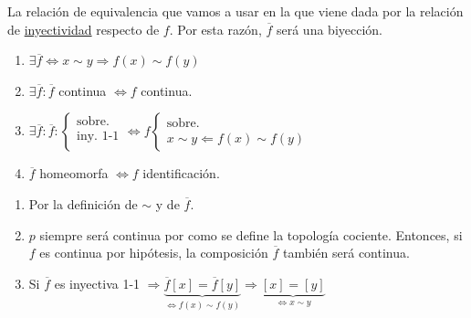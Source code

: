 \begin{obs}
La relación de equivalencia que vamos a usar en la que viene dada por la relación de \underline{inyectividad} respecto de $f$. Por esta razón, $\overline{f}$ será una biyección.
\end{obs}
\begin{prop}
\begin{enumerate}
    \item $\exists \overline{f} \Leftrightarrow x \sim y \Rightarrow f\left( x \right) \sim f\left( y \right)$
    \item $\exists \overline{f} : \overline{f}$ continua $\Leftrightarrow f$ continua.
    \item $\exists \overline{f}: \overline{f}: \begin{cases}
        \text{sobre. }\\ 
        \text{iny. 1-1}\\ 
    \end{cases} \Leftrightarrow f \begin{cases}
        \text{sobre.}\\ 
        x \sim y \Leftarrow f \left( x \right) \sim f \left( y \right)
    \end{cases}$

    \item $\overline{f}$ homeomorfa $\Leftrightarrow f$ identificación.
    \begin{figure}[H]
        \centering
    \end{figure}
\end{enumerate} 
\end{prop}
\begin{demo}
\begin{enumerate}
    \item Por la definición de $\sim$ y de $\overline{f}$.
    \item $p$ siempre será continua por como se define la topología cociente. Entonces, si $f$ es continua por hipótesis, la composición $\overline{f}$ también será continua. 

    \item Si $\overline{f}$ es inyectiva 1-1 $\Rightarrow \underbrace{\overline{f}\left[ x \right] = \overline{f}\left[ y \right]}_{\Leftrightarrow f\left( x \right) \sim f\left( y \right)} \Rightarrow \underbrace{\left[ x \right] = \left[ y \right]}_{\Leftrightarrow x \sim y}$
\end{enumerate}
\end{demo}


